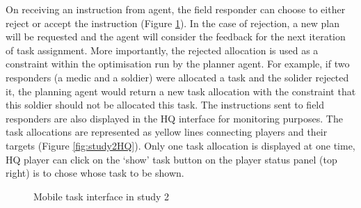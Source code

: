 On receiving an instruction from agent, the field responder can choose to either reject or accept the instruction (Figure \ref{fig:study2mobiletask}). In the case of rejection, a new plan will be requested and the agent will consider the feedback for the next iteration of task assignment. More importantly, the rejected allocation is used as a constraint within the optimisation run by the planner agent. For example, if two responders (a medic and a soldier) were allocated a task and the solider rejected it, the planning agent would return a new task allocation with the constraint that this soldier should not be allocated this task. The instructions sent to field responders are also displayed in the HQ interface for monitoring purposes. The task allocations are represented as yellow lines connecting players and their targets (Figure \ref{fig:study2HQ}). Only one task allocation is displayed at one time, HQ player can click on the `show' task button on the player status panel (top right) is to chose whose task to be shown.  \\

\begin{figure}[h]
  \centering
  \caption{Mobile task interface in study 2}
  \label{fig:study2mobiletask}
\end{figure}

